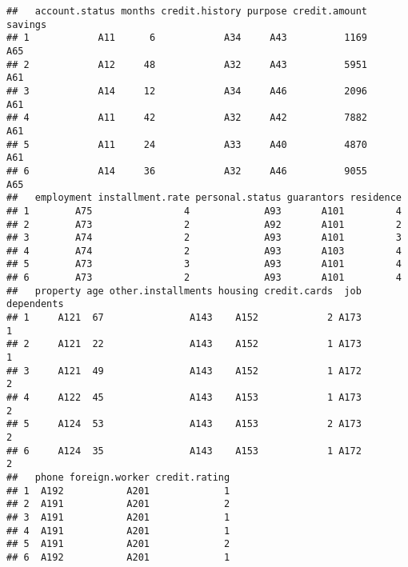 \documentclass[]{article}
\newenvironment{Shaded}{\begin{snugshade}}{\end{snugshade}}
\newcommand{\KeywordTok}[1]{\textcolor[rgb]{0.13,0.29,0.53}{\textbf{{#1}}}}
\newcommand{\StringTok}[1]{\textcolor[rgb]{0.31,0.60,0.02}{{#1}}}
\newcommand{\NormalTok}[1]{{#1}}
\numberwithin{equation}{section}
\begin{document}
\begin{verbatim}
##   account.status months credit.history purpose credit.amount savings
## 1            A11      6            A34     A43          1169     A65
## 2            A12     48            A32     A43          5951     A61
## 3            A14     12            A34     A46          2096     A61
## 4            A11     42            A32     A42          7882     A61
## 5            A11     24            A33     A40          4870     A61
## 6            A14     36            A32     A46          9055     A65
##   employment installment.rate personal.status guarantors residence
## 1        A75                4             A93       A101         4
## 2        A73                2             A92       A101         2
## 3        A74                2             A93       A101         3
## 4        A74                2             A93       A103         4
## 5        A73                3             A93       A101         4
## 6        A73                2             A93       A101         4
##   property age other.installments housing credit.cards  job dependents
## 1     A121  67               A143    A152            2 A173          1
## 2     A121  22               A143    A152            1 A173          1
## 3     A121  49               A143    A152            1 A172          2
## 4     A122  45               A143    A153            1 A173          2
## 5     A124  53               A143    A153            2 A173          2
## 6     A124  35               A143    A153            1 A172          2
##   phone foreign.worker credit.rating
## 1  A192           A201             1
## 2  A191           A201             2
## 3  A191           A201             1
## 4  A191           A201             1
## 5  A191           A201             2
## 6  A192           A201             1
\end{verbatim}

\begin{Shaded}
\end{Shaded}
\end{document}
